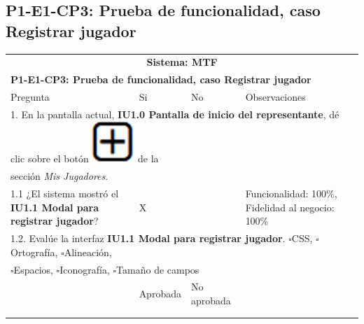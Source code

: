 \documentclass[oneside,10pt]{book}
\begin{document}
\subsection{P1-E1-CP3: Prueba de funcionalidad, caso Registrar jugador}

\begin{tabularx}{\textwidth}{ X l l X }
\multicolumn{4}{c}{\cellcolor[HTML]{9B9B9B}\textbf{Sistema: MTF}}                                                                                     \\
\multicolumn{4}{l}{\cellcolor[HTML]{EFEFEF}\textbf{P1-E1-CP3: Prueba de funcionalidad, caso Registrar jugador}}                                    \\ \hline
\multicolumn{1}{|X|}{Pregunta}                               & \multicolumn{1}{l|}{Si} & \multicolumn{1}{l|}{No} & \multicolumn{1}{X|}{Observaciones} \\ \hline
\multicolumn{4}{|l|}{1. En la pantalla actual, \textbf{IU1.0 Pantalla de inicio del representante}, dé clic sobre el botón \includegraphics[scale=.3]{images/add} de la}              \\
\multicolumn{4}{|l|}{sección \textit{Mis Jugadores}.} \\ \hline
\multicolumn{1}{|X|}{1.1 ¿El sistema mostró el \textbf{IU1.1 Modal para registrar jugador}?} & \multicolumn{1}{l|}{X}   & \multicolumn{1}{l|}{}   & \multicolumn{1}{X|}{Funcionalidad: 100\%, Fidelidad al negocio: 100\%}              \\ \hline
\multicolumn{4}{|l|}{1.2. Evalúe la interfaz \textbf{IU1.1 Modal para registrar jugador}. $\square$CSS, $\square$Ortografía, $\square$Alineación,}                        \\
\multicolumn{4}{|l|}{$\square$Espacios, $\square$Iconografía, $\square$Tamaño de campos}                        \\ \hline
\multicolumn{1}{|l|}{ }	& \multicolumn{1}{l|}{Aprobada} & \multicolumn{1}{l|}{No aprobada} & \multicolumn{1}{l|}{ } \\ \hline
\multicolumn{1}{|l|}{ } & \multicolumn{1}{l|}{ } & \multicolumn{1}{l|}{ } & \multicolumn{1}{l|}{ } \\
\multicolumn{1}{|l|}{ } & \multicolumn{1}{l|}{ } & \multicolumn{1}{l|}{ } & \multicolumn{1}{l|}{ } \\ \hline


\end{tabularx}
\end{document}
